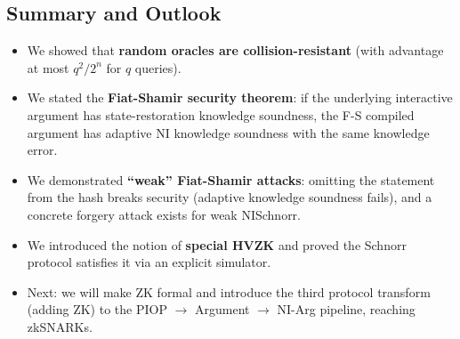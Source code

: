 \documentclass[11pt]{article}
\begin{document}
\subsection{Summary and Outlook}

\begin{itemize}
  \item We showed that \textbf{random oracles are collision-resistant} (with
        advantage at most $q^2/2^n$ for $q$ queries).
  \item We stated the \textbf{Fiat-Shamir security theorem}: if the underlying
        interactive argument has state-restoration knowledge soundness, the F-S
        compiled argument has adaptive NI knowledge soundness with the same
        knowledge error.
  \item We demonstrated \textbf{``weak'' Fiat-Shamir attacks}: omitting the
        statement from the hash breaks security (adaptive knowledge soundness
        fails), and a concrete forgery attack exists for weak NISchnorr.
  \item We introduced the notion of \textbf{special HVZK} and proved the
        Schnorr protocol satisfies it via an explicit simulator.
  \item Next: we will make ZK formal and introduce the third protocol transform
        (adding ZK) to the PIOP $\to$ Argument $\to$ NI-Arg pipeline, reaching
        zkSNARKs.
\end{itemize}
\end{document}
